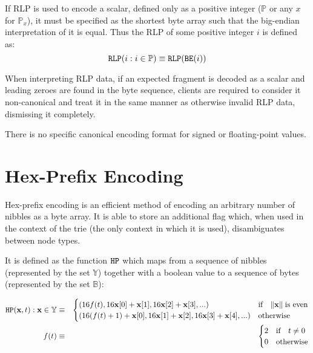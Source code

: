 \documentclass[9pt,oneside]{amsart}
\begin{document}
If RLP is used to encode a scalar, defined only as a positive integer ($\mathbb{P}$ or any $x$ for $\mathbb{P}_x$), it must be specified as the shortest byte array such that the big-endian interpretation of it is equal. Thus the RLP of some positive integer $i$ is defined as:
\begin{equation}
\mathtt{\tiny RLP}(i : i \in \mathbb{P}) \equiv \mathtt{\tiny RLP}(\mathtt{\tiny BE}(i))
\end{equation}

When interpreting RLP data, if an expected fragment is decoded as a scalar and leading zeroes are found in the byte sequence, clients are required to consider it non-canonical and treat it in the same manner as otherwise invalid RLP data, dismissing it completely.

There is no specific canonical encoding format for signed or floating-point values.

\section{Hex-Prefix Encoding}\label{app:hexprefix}
Hex-prefix encoding is an efficient method of encoding an arbitrary number of nibbles as a byte array. It is able to store an additional flag which, when used in the context of the trie (the only context in which it is used), disambiguates between node types.

It is defined as the function $\mathtt{\tiny HP}$ which maps from a sequence of nibbles (represented by the set $\mathbb{Y}$) together with a boolean value to a sequence of bytes (represented by the set $\mathbb{B}$):

\begin{eqnarray}
\mathtt{\tiny HP}(\mathbf{x}, t): \mathbf{x} \in \mathbb{Y} & \equiv & \begin{cases}
(16f(t), 16\mathbf{x}[0] + \mathbf{x}[1], 16\mathbf{x}[2] + \mathbf{x}[3], ...) &
\text{if} \quad \lVert \mathbf{x} \rVert \; \text{is even} \\
(16(f(t) + 1) + \mathbf{x}[0], 16\mathbf{x}[1] + \mathbf{x}[2], 16\mathbf{x}[3] + \mathbf{x}[4], ...) &
\text{otherwise}
\end{cases} \\
f(t) & \equiv & \begin{cases} 2 & \text{if} \quad t \neq 0 \\ 0 & \text{otherwise} \end{cases}
\end{eqnarray}
\end{document}
